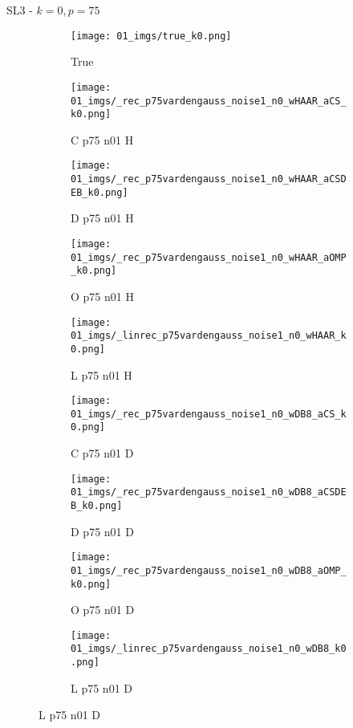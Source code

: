 \begin{frame}{SL3 - $k=0,p=75$}{}
\begin{figure}
\begin{subfigure}{0.1\textwidth}
\texttt{[image: 01\_imgs/true\_k0.png]}
\caption*{\Tiny True}
\end{subfigure}
\begin{subfigure}{0.1\textwidth}
\texttt{[image: 01\_imgs/\_rec\_p75vardengauss\_noise1\_n0\_wHAAR\_aCS\_k0.png]}
\caption*{\Tiny C p75 n01 H}
\end{subfigure}
\begin{subfigure}{0.1\textwidth}
\texttt{[image: 01\_imgs/\_rec\_p75vardengauss\_noise1\_n0\_wHAAR\_aCSDEB\_k0.png]}
\caption*{\Tiny D p75 n01 H}
\end{subfigure}
\begin{subfigure}{0.1\textwidth}
\texttt{[image: 01\_imgs/\_rec\_p75vardengauss\_noise1\_n0\_wHAAR\_aOMP\_k0.png]}
\caption*{\Tiny O p75 n01 H}
\end{subfigure}
\begin{subfigure}{0.1\textwidth}
\texttt{[image: 01\_imgs/\_linrec\_p75vardengauss\_noise1\_n0\_wHAAR\_k0.png]}
\caption*{\Tiny L p75 n01 H}
\end{subfigure}
\begin{subfigure}{0.1\textwidth}
\texttt{[image: 01\_imgs/\_rec\_p75vardengauss\_noise1\_n0\_wDB8\_aCS\_k0.png]}
\caption*{\Tiny C p75 n01 D}
\end{subfigure}
\begin{subfigure}{0.1\textwidth}
\texttt{[image: 01\_imgs/\_rec\_p75vardengauss\_noise1\_n0\_wDB8\_aCSDEB\_k0.png]}
\caption*{\Tiny D p75 n01 D}
\end{subfigure}
\begin{subfigure}{0.1\textwidth}
\texttt{[image: 01\_imgs/\_rec\_p75vardengauss\_noise1\_n0\_wDB8\_aOMP\_k0.png]}
\caption*{\Tiny O p75 n01 D}
\end{subfigure}
\begin{subfigure}{0.1\textwidth}
\texttt{[image: 01\_imgs/\_linrec\_p75vardengauss\_noise1\_n0\_wDB8\_k0.png]}
\caption*{\Tiny L p75 n01 D}
\end{subfigure}

\vspace{5pt}


\end{figure}
\end{frame}
